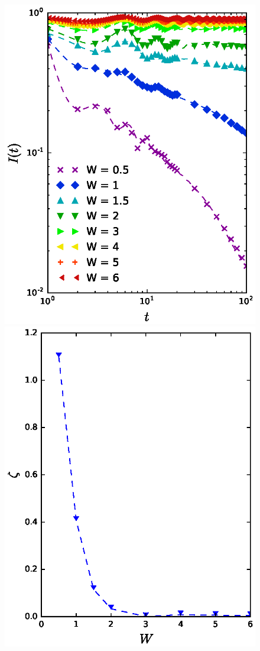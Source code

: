 \documentclass[prl,aps,epsf,showpacs,twocolumn,letterpaper]{revtex4}
\begin{document}
\begin{figure}[h]
        \centering
	\includegraphics[width=0.49\linewidth]{imbalance_fit.ps} \includegraphics[width=0.49\linewidth]{zeta_plot.ps}


\end{figure}
\end{document}
